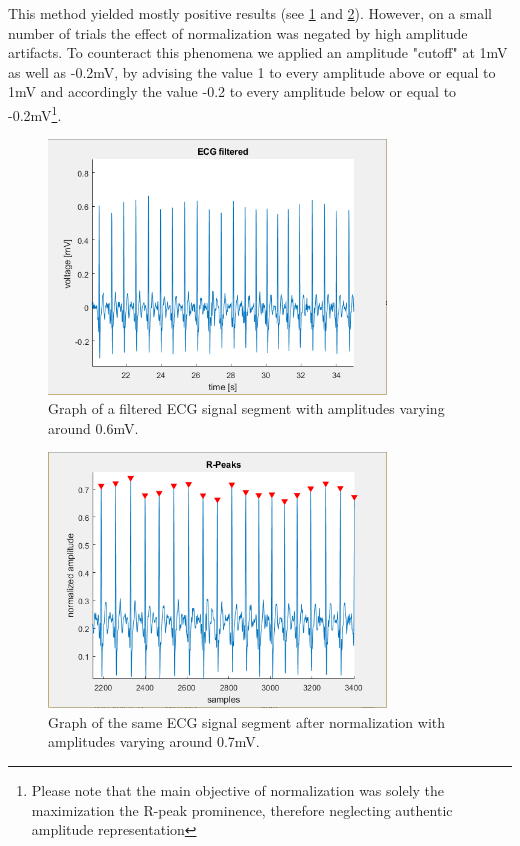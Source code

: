 This method yielded mostly positive results (see \ref{ecgfiltImg} and \ref{ecgnormImg}). However, on a small number of trials the effect of normalization was negated by high amplitude artifacts. To counteract this phenomena we applied an amplitude "cutoff" at 1mV as well as -0.2mV, by advising the value 1 to every amplitude above or equal to 1mV and accordingly the value -0.2 to every amplitude below or equal to -0.2mV\footnote{Please note that the main objective of normalization was solely the maximization the R-peak prominence, therefore neglecting authentic amplitude representation}.

\newpage
\begin{figure}[ht]
\centering
\includegraphics[width=0.8\textwidth]{images/ecgfiltered.png}
\caption{Graph of a filtered ECG signal segment with amplitudes varying around 0.6mV. }
\label{ecgfiltImg}
\end{figure}

\begin{figure}[ht]
\centering
\includegraphics[width=0.8\textwidth]{images/ecgnorm.png}
\caption{Graph of the same ECG signal segment after normalization with amplitudes varying around 0.7mV. }
\label{ecgnormImg}
\end{figure}

